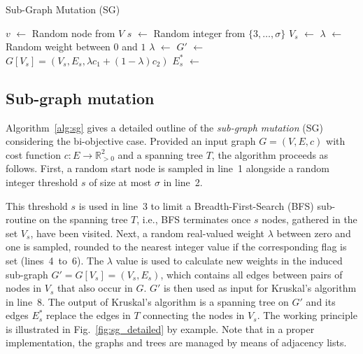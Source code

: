 \documentclass[twoside]{article}
\begin{document}
\begin{algorithm}[t]
\caption{Sub-Graph Mutation (SG)}
\label{alg:sg}
\begin{algorithmic}[1]
    \State $v$ $\gets$ Random node from $V$
    \State $s$ $\gets$ Random integer from $\{3, \ldots, \sigma\}$
    \State $V_s$ $\gets$  
    \State $\lambda$ $\gets$ Random weight between $0$ and $1$
        \State $\lambda$ $\gets$  
    \EndIf
    \State $G'$ $\gets$ $G[V_s] = (V_s, E_s, \lambda c_1 + (1 - \lambda)c_2)$ 
    \State $E_s^{*}$ $\gets$ 
    \State {}
\end{algorithmic}
\end{algorithm}

\subsection{Sub-graph mutation}

Algorithm~\ref{alg:sg} gives a detailed outline of the \emph{sub-graph mutation} (SG) considering the bi-objective case. Provided an input graph $G = (V, E, c)$ with cost function $c : E \to \mathbb{R}^2_{>0}$ and a spanning tree $T$, the algorithm proceeds as follows. First, a random start node is sampled in line~1 alongside a random integer threshold $s$ of size at most $\sigma$ in line~2.

This threshold $s$ is used in line~3 to limit a Breadth-First-Search (BFS) sub-routine on the spanning tree $T$, i.e., BFS terminates once $s$ nodes, gathered in the set $V_s$, have been visited. Next, a random real-valued weight $\lambda$ between zero and one is sampled, rounded to the nearest integer value if the corresponding flag is set (lines~4~to~6). The $\lambda$ value is used to calculate new weights in the induced sub-graph $G' = G[V_s] = (V_s, E_s)$, which contains all edges between pairs of nodes in $V_s$ that also occur in $G$. $G'$ is then used as input for Kruskal's algorithm in line~8. The output of Kruskal's algorithm is a spanning tree on $G'$ and its edges $E_s^{*}$ replace the edges in $T$ connecting the nodes in $V_s$. The working principle is illustrated in Fig.~\ref{fig:sg_detailed} by example. Note that in a proper implementation, the graphs and trees are managed by means of adjacency lists. 
\end{document}
